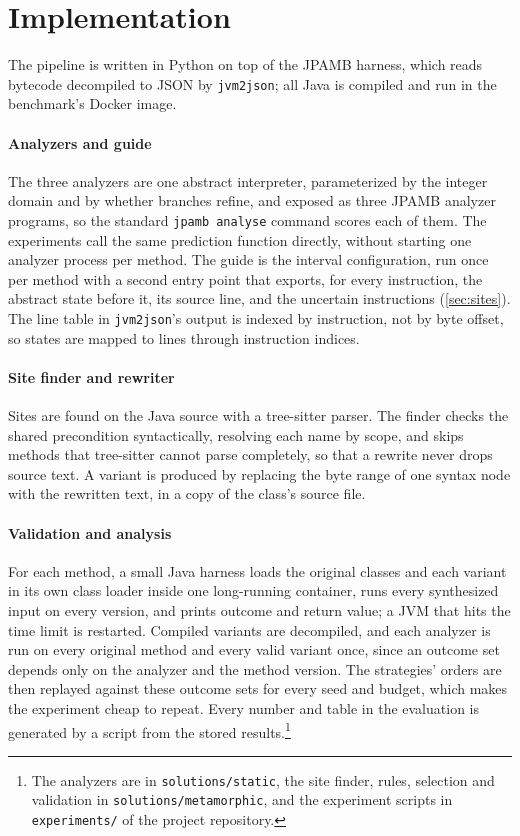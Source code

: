 \section{Implementation}
\label{sec:implementation}
The pipeline is written in Python on top of the JPAMB harness, which reads
bytecode decompiled to JSON by \texttt{jvm2json}; all Java is compiled and run
in the benchmark's Docker image.

\paragraph{Analyzers and guide}
The three analyzers are one abstract interpreter, parameterized by the integer
domain and by whether branches refine, and exposed as three JPAMB analyzer
programs, so the standard \texttt{jpamb analyse} command scores each of them.
The experiments call the same prediction function directly, without starting
one analyzer process per method. The guide is
the interval configuration, run once per method with a second entry point that
exports, for every instruction, the abstract state before it, its source line,
and the uncertain instructions (\cref{sec:sites}). The line table in
\texttt{jvm2json}'s output is indexed by instruction, not by byte offset, so
states are mapped to lines through instruction indices.

\paragraph{Site finder and rewriter}
Sites are found on the Java source with a tree-sitter parser. The finder
checks the shared precondition syntactically, resolving each name by scope, and
skips methods that tree-sitter cannot parse completely, so that a rewrite never
drops source text. A variant is produced by replacing the byte range of one
syntax node with the rewritten text, in a copy of the class's source file.

\paragraph{Validation and analysis}
For each method, a small Java harness loads the original classes and each
variant in its own class loader inside one long-running container, runs every
synthesized input on every version, and prints outcome and return value; a JVM
that hits the time limit is restarted. Compiled variants are decompiled, and each
analyzer is run on every original method and every valid variant once, since
an outcome set depends only on the analyzer and the method version. The
strategies' orders are then replayed against these outcome sets for every seed
and budget, which makes the experiment cheap to repeat. Every number and table
in the evaluation is generated by a script from the stored results.\footnote{The
analyzers are in \texttt{solutions/static}, the site finder, rules, selection
and validation in \texttt{solutions/metamorphic}, and the experiment scripts in
\texttt{experiments/} of the project repository.}
